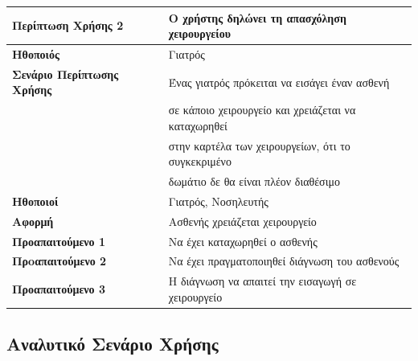 \documentclass{article}
\newcommand\T{\rule{0pt}{2.6ex}}       %
\newcommand\B{\rule[-1.2ex]{0pt}{0pt}}
\begin{document}
\begin{center}
     \begin{tabular}{|l|l|}
     \hline
      \textbf{Περίπτωση Χρήσης 2 }   & Ο χρήστης δηλώνει τη απασχόληση χειρουργείου\T\B \\ 
      \hline
      \textbf{Ηθοποιός} & Γιατρός \T\B \\
      \hline
      \textbf{Σενάριο Περίπτωσης Χρήσης} & Ένας γιατρός πρόκειται να εισάγει έναν ασθενή\\& σε κάποιο χειρουργείο και χρειάζεται να καταχωρηθεί\\& στην καρτέλα των χειρουργείων, ότι το συγκεκριμένο\\& δωμάτιο δε θα είναι πλέον διαθέσιμο\T\B \\
      \hline
      \textbf{Ηθοποιοί} & Γιατρός, Νοσηλευτής \T\B \\
      \hline
      \textbf{Αφορμή} & Ασθενής χρειάζεται χειρουργείο \T\B \\
      \hline
      \textbf{Προαπαιτούμενο 1} & Να έχει καταχωρηθεί ο ασθενής \T\B \\
      \hline
      \textbf{Πρoαπαιτούμενο 2} & Να έχει πραγματοποιηθεί διάγνωση του ασθενούς \T\B \\
      \hline
      \textbf{Προαπαιτούμενο 3} & Η διάγνωση να απαιτεί την εισαγωγή σε χειρουργείο \T\B \\
      \hline
     \end{tabular}
 \end{center}
 
 \subsection{Αναλυτικό Σενάριο Χρήσης}
 
\end{document}
